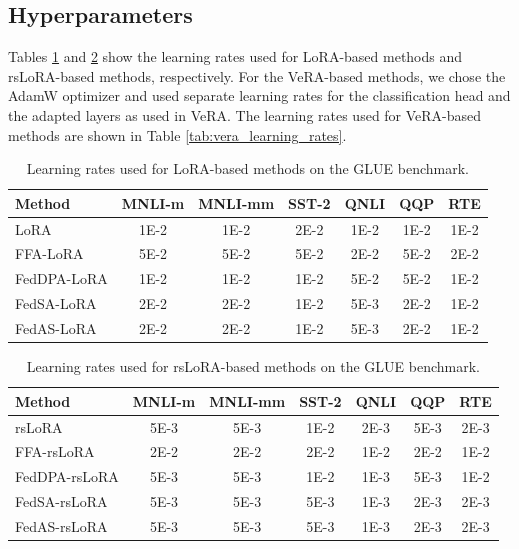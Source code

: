 \documentclass[lettersize,journal]{IEEEtran}
\begin{document}
	\subsection*{Hyperparameters}
	Tables \ref{tab:lora_learning_rates} and \ref{tab:rslora_learning_rates} show the learning rates used for LoRA-based methods and rsLoRA-based methods, respectively. For the VeRA-based methods, we chose the AdamW optimizer and used separate learning rates for the classification head and the adapted layers as used in VeRA. The learning rates used for VeRA-based methods are shown in Table \ref{tab:vera_learning_rates}.
	\begin{table}[b]
		\centering
		\scriptsize
		\setlength{\tabcolsep}{1.5pt}
		\renewcommand{\arraystretch}{1.08}
		\begin{tabular*}{0.98\columnwidth}{@{\extracolsep{\fill}}lcccccc@{}}
			\toprule
			Method & MNLI-m & MNLI-mm & SST-2 & QNLI & QQP & RTE \\
			\midrule
			LoRA
			& 1E-2 & 1E-2 & 2E-2 & 1E-2 & 1E-2 & 1E-2 \\
			
			FFA-LoRA
			& 5E-2 & 5E-2 & 5E-2 & 2E-2 & 5E-2 & 2E-2 \\
			
			FedDPA-LoRA
			& 1E-2 & 1E-2 & 1E-2 & 5E-2 & 5E-2 & 1E-2 \\
			
			FedSA-LoRA
			& 2E-2 & 2E-2 & 1E-2 & 5E-3 & 2E-2 & 1E-2 \\
			
			FedAS-LoRA
			& 2E-2 & 2E-2 & 1E-2 & 5E-3 & 2E-2 & 1E-2 \\
			\bottomrule
		\end{tabular*}
		\caption{Learning rates used for LoRA-based methods on the GLUE benchmark.}
		\label{tab:lora_learning_rates}
	\end{table}
	\begin{table}[h]
		\centering
		\small
		\setlength{\tabcolsep}{1.5pt}
		\renewcommand{\arraystretch}{1.08}
		\begin{tabular*}{0.98\columnwidth}{@{\extracolsep{\fill}}lcccccc@{}}
			\toprule
			Method & MNLI-m & MNLI-mm & SST-2 & QNLI & QQP & RTE \\
			\midrule
			rsLoRA
			& 5E-3 & 5E-3 & 1E-2 & 2E-3 & 5E-3 & 2E-3 \\
			
			FFA-rsLoRA
			& 2E-2 & 2E-2 & 2E-2 & 1E-2 & 2E-2 & 1E-2 \\
			
			FedDPA-rsLoRA
			& 5E-3 & 5E-3 & 1E-2 & 1E-3 & 5E-3 & 1E-2 \\
			
			FedSA-rsLoRA
			& 5E-3 & 5E-3 & 5E-3 & 1E-3 & 2E-3 & 2E-3 \\
			
			FedAS-rsLoRA
			& 5E-3 & 5E-3 & 5E-3 & 1E-3 & 2E-3 & 2E-3 \\
			\bottomrule
		\end{tabular*}
		\caption{Learning rates used for rsLoRA-based methods on the GLUE benchmark.}
		\label{tab:rslora_learning_rates}
	\end{table}
\end{document}
